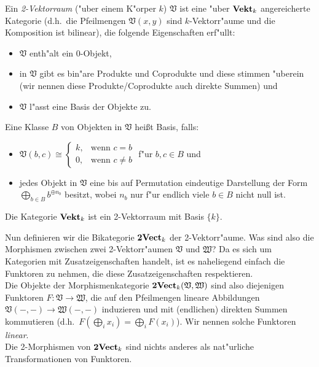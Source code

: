 \begin{Def}
Ein \emph{2-Vektorraum} ("uber einem K"orper $k$) $\mathfrak V$ ist eine "uber $\mathbf{Vekt}_k$ angereicherte Kategorie (d.h.\ die Pfeilmengen $\mathfrak V(x,y)$ sind $k$-Vektorr"aume und die Komposition ist bilinear), die folgende Eigenschaften erf"ullt:
\begin{itemize}
\item $\mathfrak V$ enth"alt ein $0$-Objekt,
\item in $\mathfrak V$ gibt es bin"are Produkte und Coprodukte und diese stimmen "uberein (wir nennen diese Produkte/Coprodukte auch direkte Summen) und
\item $\mathfrak V$ l"asst eine Basis der Objekte zu.
\end{itemize}
Eine Klasse $B$ von Objekten in $\mathfrak V$ hei\ss t Basis, falls:
\begin{itemize}
\item $\mathfrak V(b,c) \cong\begin{cases}
  k,  & \text{wenn }c=b\\
  0, & \text{wenn }c\neq b
\end{cases}$ f"ur $b,c \in B$ und
\item jedes Objekt in $\mathfrak V$ eine bis auf Permutation eindeutige Darstellung der Form $\bigoplus\limits_{b\in B} b^{\oplus n_b}$ besitzt, wobei $n_b$ nur f"ur endlich viele $b\in B$ nicht null ist.
\end{itemize}
\end{Def}

\begin{Bsp}
Die Kategorie $\mathbf{Vekt}_k$ ist ein 2-Vektorraum mit Basis $\{k\}$.
\end{Bsp}

Nun definieren wir die Bikategorie $\mathbf{2Vect}_k$ der 2-Vektorr"aume. Was sind also die Morphismen zwischen zwei 2-Vektorr"aumen $\mathfrak V$ und $\mathfrak W$? Da es sich um Kategorien mit Zusatzeigenschaften handelt, ist es naheliegend einfach die Funktoren zu nehmen, die diese Zusatzeigenschaften respektieren.\\
Die Objekte der Morphismenkategorie $\mathbf{2Vect}_k(\mathfrak V,\mathfrak W)$ sind also  diejenigen Funktoren $F\colon \mathfrak V\to \mathfrak W$, die auf den Pfeilmengen lineare Abbildungen $\mathfrak V(-,-)\to\mathfrak W(-,-)$ induzieren und mit (endlichen) direkten Summen kommutieren (d.h.\ $F\left(\bigoplus_i x_i\right)=\bigoplus_i F(x_i)$). Wir nennen solche Funktoren \emph{linear}.\\
Die 2-Morphismen von $\mathbf{2Vect}_k$ sind nichts anderes als nat"urliche Transformationen von Funktoren.

